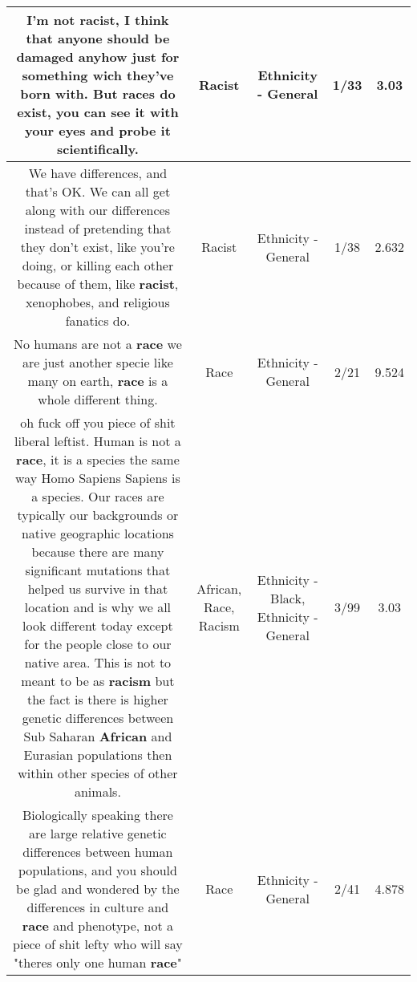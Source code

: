 \documentclass[11pt]{article}
\newlength\mylength
\begin{document}
\begin{center}
\begin{longtable}{|C{.65\mylength}|C{.30\mylength}|C{.12\mylength}|C{.12\mylength}|C{.12\mylength}|}
  \small I'm not \textbf{racist}, I think that anyone should be damaged anyhow  just for something wich they've born with. But races do exist, you can see it with your eyes and probe it scientifically.\normalsize   & Racist & Ethnicity - General & 1/33 & 3.03 \\  \hline
  \small We have differences, and that's OK. We can all get along with our differences instead of pretending that they don't exist, like you're doing, or killing each other because of them, like \textbf{racist}, xenophobes, and religious fanatics do.\normalsize   & Racist & Ethnicity - General & 1/38 & 2.632 \\  \hline
  \small No humans are not a \textbf{race} we are just another specie like many on earth, \textbf{race} is a whole different thing.\normalsize   & Race & Ethnicity - General & 2/21 & 9.524 \\  \hline
  \small oh fuck off you piece of shit liberal leftist. Human is not a \textbf{race}, it is a species the same way Homo Sapiens Sapiens is a species. Our races are typically our backgrounds or native geographic locations because there are many significant mutations that helped us survive in that location and is why we all look different today except for the people close to our native area. This is not to meant to be as \textbf{racism} but the fact is there is higher genetic differences between Sub Saharan \textbf{African} and Eurasian populations then within other species of other animals.\normalsize   & African, Race, Racism & Ethnicity - Black, Ethnicity - General & 3/99 & 3.03 \\  \hline
  \small Biologically speaking there are large relative genetic differences between human populations, and you should be glad and wondered by the differences in culture and \textbf{race} and phenotype, not a piece of shit lefty who will say "theres only one human \textbf{race}"\normalsize   & Race & Ethnicity - General & 2/41 & 4.878 \\  \hline

\end{longtable}
\end{center}
\end{document}

